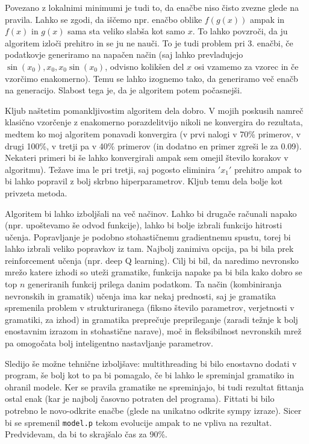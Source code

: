 \documentclass{article}
\begin{document}
Povezano z lokalnimi minimumi je tudi to, da enačbe niso čisto zvezne glede na pravila. Lahko se zgodi, da iščemo npr. enačbo oblike \(f(g(x))\) ampak in \(f(x)\) in \(g(x)\) sama sta veliko slabša kot samo \(x\). To lahko povzroči, da ju algoritem izloči prehitro in se ju ne nauči. To je tudi problem pri 3. enačbi, če podatkovje generiramo na napačen način (saj lahko prevladujejo \(\sin(x_0), x_0, x_0\sin(x_0)\), odvisno kolikšen del \(x\) osi vzamemo za vzorec in če vzorčimo enakomerno). Temu se lahko izognemo tako, da generiramo več enačb na generacijo. Slabost tega je, da je algoritem potem počasnejši.

Kljub naštetim pomankljivostim algoritem dela dobro. V mojih poskusih namreč klasično vzorčenje z enakomerno porazdelitvijo nikoli ne konvergira do rezultata, medtem ko moj algoritem ponavadi konvergira (v prvi nalogi v 70\% primerov, v drugi 100\%, v tretji pa v 40\% primerov (in dodatno en primer zgreši le za 0.09). Nekateri primeri bi še lahko konvergirali ampak sem omejil število korakov v algoritmu). Težave ima le pri tretji, saj pogosto eliminira \('x_1'\) prehitro ampak to bi lahko popravil z bolj skrbno hiperparametrov. Kljub temu dela bolje kot privzeta metoda.

Algoritem bi lahko izboljšali na več načinov. Lahko bi drugače računali napako (npr. upoštevamo še odvod funkcije), lahko bi bolje izbrali funkcijo hitrosti učenja. Popravljanje je podobno stohastičnemu gradientnemu spustu, torej bi lahko izbrali veliko popravkov iz tam. Najbolj zanimiva opcija, pa bi bila prek reinforcement učenja (npr. deep Q learning). Cilj bi bil, da naredimo nevronsko mrežo katere izhodi so uteži gramatike, funkcija napake pa bi bila kako dobro se top \(n\) generiranih funkcij prilega danim podatkom. Ta način (kombiniranja nevronskih in gramatik) učenja ima kar nekaj prednosti, saj je gramatika spremenila problem v strukturiranega (fiksno število parametrov, verjetnosti v gramatiki, za izhod) in gramatika preprečuje preprileganje (zaradi težnje k bolj enostavnim izrazom in stohastične narave), moč in fleksibilnost nevronskih mrež pa omogočata bolj inteligentno nastavljanje parametrov.

Sledijo še možne tehnične izboljšave: multithreading bi bilo enostavno dodati v program, še bolj kot to pa bi pomagalo, če bi lahko le spreminjal gramatiko in ohranil modele. Ker se pravila gramatike ne spreminjajo, bi tudi rezultat fittanja ostal enak (kar je najbolj časovno potraten del programa). Fittati bi bilo potrebno le novo-odkrite enačbe (glede na unikatno odkrite sympy izraze). Sicer bi se spremenil \texttt{model.p} tekom evolucije ampak to ne vpliva na rezultat. Predvidevam, da bi to skrajšalo čas za 90\%.
\end{document}
